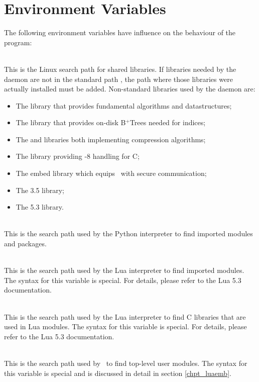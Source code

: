 \section{Environment Variables}
The following environment variables have influence
on the behaviour of the program:

\\
This is the Linux search path for shared libraries.
If libraries needed by the daemon are not in
the standard path , the path
where those libraries were actually installed
must be added.
Non-standard libraries used by the daemon are:

\begin{minipage}{\textwidth}
\begin{itemize}
\item The  library that provides
      fundamental algorithms and datastructures;
\item The  library that provides
      on-disk B$^+$Trees needed for indices;
\item The  and  libraries
      both implementing compression algorithms;
\item The  library providing -8
      handling for C;
\item The embed library which equips
      \nowdb\ with secure communication;    
\item The  3.5 library;
\item The  5.3 library.
\end{itemize}
\end{minipage}

\\
This is the search path used by the Python interpreter
to find imported modules and packages.

\\
This is the search path used by the Lua interpreter
to find imported modules.
The syntax for this variable is special.
For details, please refer to the Lua 5.3 documentation.

\\
This is the search path used by the Lua interpreter
to find C libraries that are used in Lua modules.
The syntax for this variable is special.
For details, please refer to the Lua 5.3 documentation.

\\
This is the search path used by \nowdb\ to find top-level
user modules. The syntax for this variable is special
and is discussed in detail in section \ref{chpt_luaemb}.

